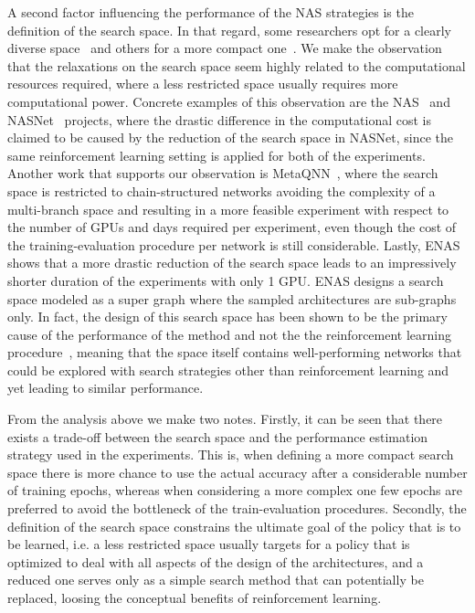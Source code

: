 A second factor influencing the performance of the NAS strategies is the definition of the search space. In that regard, some researchers opt for a clearly diverse space~\citep{ZophNAS1,ZophNAS2,BlockQNN} and others for a more compact one~\citep{PathNAS,ENAS}. We make the observation that the relaxations on the search space seem highly related to the computational resources required, where a less restricted space usually requires more computational power. Concrete examples of this observation are the NAS~\citep{ZophNAS1} and NASNet~\citep{ZophNAS2} projects, where the drastic difference in the computational cost is claimed to be caused by the reduction of the search space in NASNet, since the same reinforcement learning setting is applied for both of the experiments. Another work that supports our observation is MetaQNN~\citep{BakerNAS}, where the search space is restricted to chain-structured networks avoiding the complexity of a multi-branch space and resulting in a more feasible experiment with respect to the number of GPUs and days required per experiment, even though the cost of the training-evaluation procedure per network is still considerable. Lastly, ENAS~\citep{ENAS} shows that a more drastic reduction of the search space leads to an impressively shorter duration of the experiments with only 1 GPU. ENAS designs a search space modeled as a super graph where the sampled architectures are sub-graphs only. In fact, the design of this search space has been shown to be the primary cause of the performance of the method and not the the reinforcement learning procedure~\citep{ENASbad}, meaning that the space itself contains well-performing networks that could be explored with search strategies other than reinforcement learning and yet leading to similar performance.

From the analysis above we make two notes. Firstly, it can be seen that there exists a trade-off between the search space and the performance estimation strategy used in the experiments. This is, when defining a more compact search space there is more chance to use the actual accuracy after a considerable number of training epochs, whereas when considering a more complex one few epochs are preferred to avoid the bottleneck of the train-evaluation procedures. Secondly, the definition of the search space constrains the ultimate goal of the policy that is to be learned, i.e. a less restricted space usually targets for a policy that is optimized to deal with all aspects of the design of the architectures, and a reduced one serves only as a simple search method that can potentially be replaced, loosing the conceptual benefits of reinforcement learning. %


